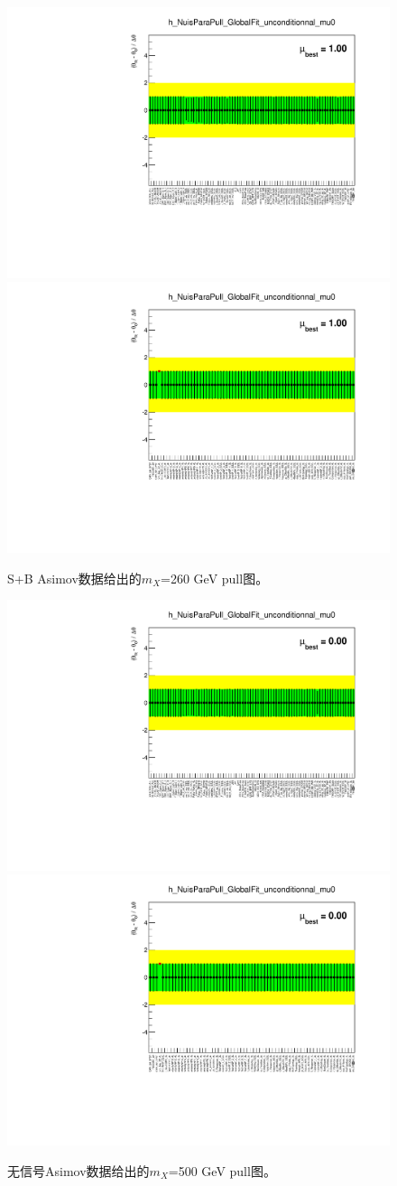 \begin{figure}
\centering
\includegraphics[width=.35\textwidth, angle=-90]{fig/Statistical/combination/pull-exp-combined-mH260_1_mu1.pdf}
\includegraphics[width=.35\textwidth, angle=-90]{fig/Statistical/combination/pull-exp-combined-mH260_2_mu1.pdf}
\caption{S+B Asimov数据给出的$m_X$=260 GeV pull图。}
\label{fig:pull-exp-comb-260_mu1}
\end{figure}

\begin{figure}
\centering
\includegraphics[width=.35\textwidth, angle=-90]{fig/Statistical/combination/pull-exp-combined-mH500_1.pdf}
\includegraphics[width=.35\textwidth, angle=-90]{fig/Statistical/combination/pull-exp-combined-mH500_2.pdf}
\caption{无信号Asimov数据给出的$m_X$=500 GeV pull图。}
\label{fig:pull-exp-comb-500}
\end{figure}

